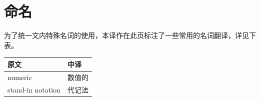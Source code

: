 \chapter{命名}

为了统一文内特殊名词的使用，本译作在此页标注了一些常用的名词翻译，详见下表。

\begin{table}[h]
    \footnotesize
    \begin{tabularx}{\linewidth}{X X}
        \toprule
        \textbf{原文} & \textbf{中译}\\
        \midrule
        numeric & 数值的 \\
        stand-in notation & 代记法 \\
        \bottomrule
    \end{tabularx}
\end{table}